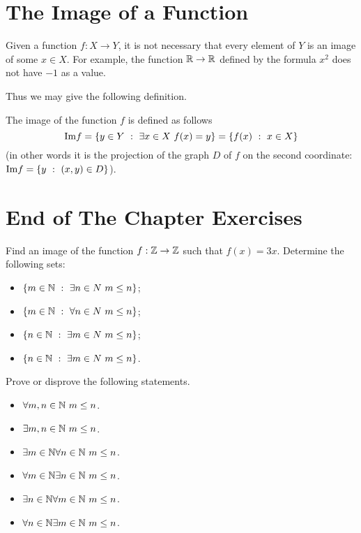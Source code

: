 \section{The Image of a Function}
Given a function $f : X \to Y$, it is not necessary that every element of $Y$
is an image of some $x \in X$. For example, the function $\mathbb{R} \to \mathbb{R}$ defined by
the formula $x^2$ does not have $-1$ as a value.

Thus we may give the following definition.
\begin{definition}
  The image of the function $f$ is defined as follows
  $$\Im f = \set[\exists x \in X\ f(x) = y]{y \in Y}
  = \set[x \in X]{f(x)}$$ (in other
  words it is the projection of the graph $D$ of $f$ on the second coordinate:
  $\Im f = \set[(x, y) \in D]{y}$).
\end{definition}

\section*{End of The Chapter Exercises}
\begin{exercises}
  \exerciseitem Find an image of the function $f : \mathbb{Z} \to \mathbb{Z}$ such that
    $f(x) = 3x$.
  \exerciseitem Determine the following sets:
    \begin{itemize}
      \item $\set[\exists n \in N \ m \le n]{m \in \N}$;
      \item $\set[\forall n \in N \ m \le n]{m \in \N}$;
      \item $\set[\exists m \in N \ m \le n]{n \in \N}$;
      \item $\set[\exists m \in N \ m \le n]{n \in \N}$.
    \end{itemize}
  \exerciseitem Prove or disprove the following statements.
    \begin{itemize}
      \item $\forall m, n \in \mathbb{N} \ m \le n$.
      \item $\exists m, n \in \mathbb{N} \ m \le n$.
      \item $\exists m \in \mathbb{N} \forall n \in \mathbb{N} \ m \le n$.
      \item $\forall m \in \mathbb{N} \exists n \in \mathbb{N} \ m \le n$.
      \item $\exists n \in \mathbb{N} \forall m \in \mathbb{N} \ m \le n$.
      \item $\forall n \in \mathbb{N} \exists m \in \mathbb{N} \ m \le n$.
    \end{itemize}
\end{exercises}

